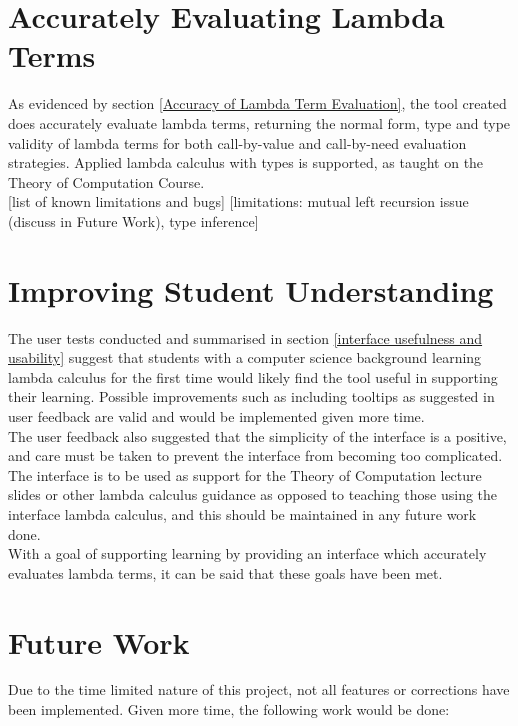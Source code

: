 \documentclass[a4paper,12pt]{report}
\begin{document}
\section{Accurately Evaluating Lambda Terms}
As evidenced by section \ref{Accuracy of Lambda Term Evaluation}, the tool created does accurately evaluate lambda terms, returning the normal form, type and type validity of lambda terms for both call-by-value and call-by-need evaluation strategies. Applied lambda calculus with types is supported, as taught on the Theory of Computation Course.\\

[list of known limitations and bugs]
[limitations: mutual left recursion issue (discuss in Future Work), type inference]

\section{Improving Student Understanding}
The user tests conducted and summarised in section \ref{interface usefulness and usability} suggest that students with a computer science background learning lambda calculus for the first time would likely find the tool useful in supporting their learning. Possible improvements such as including tooltips as suggested in user feedback are valid and would be implemented given more time.\\

The user feedback also suggested that the simplicity of the interface is a positive, and care must be taken to prevent the interface from becoming too complicated. The interface is to be used as support for the Theory of Computation lecture slides or other lambda calculus guidance as opposed to teaching those using the interface lambda calculus, and this should be maintained in any future work done.\\

With a goal of supporting learning by providing an interface which accurately evaluates lambda terms, it can be said that these goals have been met.\\

\section{Future Work}
Due to the time limited nature of this project, not all features or corrections have been implemented. Given more time, the following work would be done:
\end{document}
